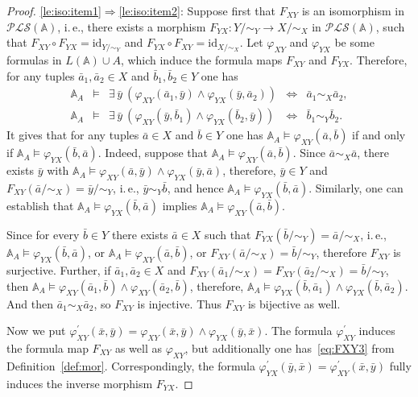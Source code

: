 \documentclass[12pt]{article}
\theoremstyle{definition}
\def\MA{{\mathbb{A}}}
\def\PLS{{\mathcal{PLS}}}
\def\id{{\mathrm{id}}}
\begin{document}
\begin{proof}
\ref{le:iso:item1}$\Longrightarrow$\ref{le:iso:item2}: Suppose first that $F_{XY}$ is an isomorphism in $\PLS(\MA)$, i.\,e., there exists a morphism $F_{YX}\colon Y/{\sim_Y}\to X/{\sim_X}$ in $\PLS(\MA)$, such that $F_{XY}\circ F_{YX}=\id_{Y/{\sim_Y}}$ and $F_{YX}\circ F_{XY}=\id_{X/{\sim_X}}$. Let $\varphi_{XY}$ and $\varphi_{YX}$ be some formulas in $L(\MA)\cup A$,  which induce the formula maps $F_{XY}$ and $F_{YX}$. Therefore, for any tuples $\bar a_1,\bar a_2 \in X$ and $\bar b_1,\bar b_2 \in Y$ one has 
\[
\left.
\begin{array}{rclcl} 
\MA_A &\models&\exists\,\bar y \:(\varphi_{XY}(\bar a_1,\bar y) \wedge \varphi_{YX}(\bar y,\bar a_2)) & \iff &\bar a_1\sim_X \bar a_2, \\
\MA_A &\models&\exists\,\bar y \:(\varphi_{XY}(\bar y,\bar b_1) \wedge \varphi_{YX}(\bar b_2,\bar y))  &\iff &\bar b_1\sim_Y \bar b_2.
\end{array}
\right.
\]
It gives that for any tuples $\bar a\in X$ and $\bar b\in Y$ one has $\MA_A\models \varphi_{XY}(\bar a,\bar b)$ if and only if $\MA_A\models \varphi_{YX}(\bar b,\bar a)$. Indeed, suppose that $\MA_A\models \varphi_{XY}(\bar a,\bar b)$. Since $\bar a\sim_X \bar a$, there exists $\bar y$ with $\MA_A\models \varphi_{XY}(\bar a,\bar y) \wedge \varphi_{YX}(\bar y,\bar a)$, therefore, $\bar y\in Y$ and $F_{XY}(\bar a/{\sim_X})=\bar y/{\sim_Y}$, i.\,e., $\bar y\sim_Y \bar b$, and hence $\MA_A\models \varphi_{YX}(\bar b,\bar a)$. Similarly, one can establish that $\MA_A\models \varphi_{YX}(\bar b,\bar a)$ implies $\MA_A\models \varphi_{XY}(\bar a,\bar b)$. 

Since for every $\bar b\in Y$ there exists $\bar a \in X$ such that $F_{YX}(\bar b/{\sim_Y})=\bar a/{\sim_X}$, i.\,e., $\MA_A\models \varphi_{YX}(\bar b,\bar a)$, or $\MA_A\models \varphi_{XY}(\bar a,\bar b)$, or $F_{XY}(\bar a/{\sim_X})=\bar b/{\sim_Y}$, therefore $F_{XY}$ is surjective.  Further, if $\bar a_1,\bar a_2\in X$ and $F_{XY}(\bar a_1/{\sim_X})=F_{XY}(\bar a_2/{\sim_X})=\bar b/{\sim_Y}$, then $\MA_A\models\varphi_{XY}(\bar a_1,\bar b)\wedge\varphi_{XY}(\bar a_2,\bar b)$, therefore, $\MA_A\models\varphi_{YX}(\bar b, \bar a_1)\wedge\varphi_{YX}(\bar b, \bar a_2)$. And then $\bar a_1\sim_X\bar a_2$, so $F_{XY}$ is injective. Thus $F_{XY}$ is bijective as well.

Now we put $\varphi^\prime_{XY}(\bar x,\bar y)=\varphi_{XY}(\bar x,\bar y)\wedge \varphi_{YX}(\bar y,\bar x)$. The formula $\varphi^\prime_{XY}$ induces the formula map $F_{XY}$ as well as $\varphi_{XY}$, but additionally one has~\ref{eq:FXY3} from Definition~\ref{def:mor}. Correspondingly, the formula $\varphi^\prime_{YX}(\bar y,\bar x)=\varphi^\prime_{XY}(\bar x,\bar y)$ fully induces the inverse morphism $F_{YX}$.


\end{proof}
\end{document}
